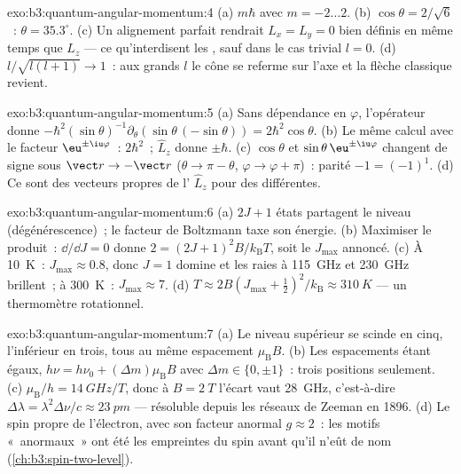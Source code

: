\begin{solution}{exo:b3:quantum-angular-momentum:4}
(a) $m\hbar$ avec $m = -2 \dots 2$. (b) $\cos\theta = 2/\sqrt6$~:
$\theta = 35.3^\circ$. (c) Un alignement parfait rendrait $L_x = L_y
= 0$ bien définis en même temps que $L_z$ --- ce qu'interdisent les
, sauf dans le cas trivial $l = 0$. (d) $l/\sqrt{l(l+1)} \to 1$~: aux
grands $l$ le cône se referme sur l'axe et la flèche classique
revient.
\end{solution}

\begin{solution}{exo:b3:quantum-angular-momentum:5}
(a) Sans dépendance en $\varphi$, l'opérateur donne
$-\hbar^2(\sin\theta)^{-1}\partial_\theta(\sin\theta\,(-\sin\theta))
= 2\hbar^2\cos\theta$. (b) Le même calcul avec le facteur
$\eu^{\pm\iu\varphi}$~:  $2\hbar^2$~; $\hat L_z$
donne $\pm\hbar$. (c) $\cos\theta$ et $\sin\theta\,\eu^{\pm\iu
\varphi}$ changent de signe sous $\vect r \to -\vect r$ ($\theta \to \pi
- \theta$, $\varphi \to \varphi + \pi$)~: parité $-1 = (-1)^1$. (d)
Ce sont des vecteurs propres de l' $\hat L_z$ pour
des  différentes.
\end{solution}

\begin{solution}{exo:b3:quantum-angular-momentum:6}
(a) $2J + 1$ états partagent le niveau (dégénérescence)~; le facteur
de Boltzmann taxe son énergie. (b) Maximiser le produit~:
$\dd/\dd J = 0$ donne $2 = (2J+1)^2B/k_{\text{B}}T$, soit le
$J_{\max}$ annoncé. (c) À \qty{10}{K}~: $J_{\max} \approx 0.8$, donc
$J = 1$ domine et les raies à \qty{115}{GHz} et \qty{230}{GHz}
brillent~; à \qty{300}{K}~: $J_{\max} \approx 7$. (d) $T \approx 2B(J_{\max} + \tfrac12)^2/
k_{\text{B}} \approx \qty{310}{K}$ --- un thermomètre rotationnel.
\end{solution}

\begin{solution}{exo:b3:quantum-angular-momentum:7}
(a) Le niveau supérieur se scinde en cinq, l'inférieur en trois, tous
au même espacement $\mu_{\text{B}}B$. (b) Les espacements étant égaux,
$h\nu = h\nu_0 + (\Delta m)\mu_{\text{B}}B$ avec $\Delta m \in \{0,
\pm1\}$~: trois positions seulement. (c) $\mu_{\text{B}}/h = \qty{14}{GHz/T}$, donc à $B = \qty{2}{T}$
l'écart vaut \qty{28}{GHz}, c'est-à-dire $\Delta\lambda =
\lambda^2\Delta\nu/c \approx \qty{23}{pm}$ --- résoluble depuis les
réseaux de Zeeman en 1896.
(d) Le spin propre de l'électron, avec son facteur anormal $g \approx
2$~: les motifs «~anormaux~» ont été les empreintes du spin avant
qu'il n'eût de nom (\cref{ch:b3:spin-two-level}).
\end{solution}


